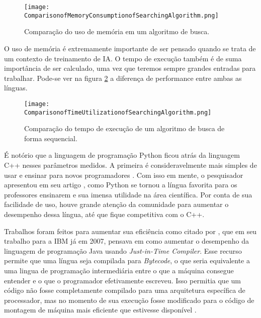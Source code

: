 \begin{figure}[!ht]
    \centering
    \texttt{[image: ComparisonofMemoryConsumptionofSearchingAlgorithm.png]}
    \caption[a]{Comparação do uso de memória em um algoritmo de busca\footnotemark.}
    \label{fig:comparisonMemorycppvspython}
\end{figure}


O uso de memória é extremamente importante de ser pensado quando se trata de um contexto de treinamento
de IA. O tempo de execução também é de suma importância de ser calculado, uma vez que teremos sempre 
grandes entradas para trabalhar. Pode-se ver na figura \ref{fig:speedcppvspython} a diferença de performance
entre ambas as línguas.

\begin{figure}[!ht]
    \centering
    \texttt{[image: ComparisonofTimeUtilizationofSearchingAlgorithm.png]}
    \caption[a]{Comparação do tempo de execução de um algoritmo de busca de forma sequencial\footnotemark.}
    \label{fig:speedcppvspython}
\end{figure}


É notório que a linguagem de programação Python ficou atrás da linguagem C++ nesses parâmetros medidos. 
A primeira é consideravelmente mais simples de usar e ensinar para novos programadores \cite{C++vsPython}. 
Com isso em mente, o pesquisador \citeauthor{HPC_Python} apresentou em seu artigo ,
como Python se tornou a língua favorita para os professores ensinarem e sua imensa utilidade na área científica. 
Por conta de sua facilidade de uso, houve grande atenção da comunidade para aumentar o desempenho dessa língua, até
que fique competitiva com o C++.

Trabalhos foram feitos para aumentar sua eficiência como citado por \citeauthor{JIT}, que em seu trabalho
para a IBM já em 2007, pensava em como aumentar o desempenho da linguagem de programação Java usando 
\emph{Just-in-Time Compiler}. Esse recurso permite que uma língua seja compilada para \emph{Bytecode}, o que
seria equivalente a uma lingua de programação intermediária entre o que a máquina consegue entender e o que o 
programador efetivamente escreveu. Isso permitia que um código não fosse completamente compilado para uma arquitetura
específica de processador, mas no momento de sua execução fosse modificado para o código de montagem de máquina
mais eficiente que estivesse disponível \cite{JIT}.

